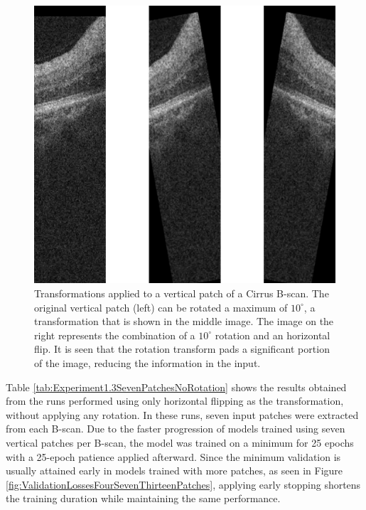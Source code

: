 \begin{figure}[!ht]
	\centering
	\includegraphics[width=0.5\linewidth]{figures/TransformationsInVerticalPatches.png}
	\caption{Transformations applied to a vertical patch of a Cirrus B-scan. The original vertical patch (left) can be rotated a maximum of $10^{\circ}$, a transformation that is shown in the middle image. The image on the right represents the combination of a $10^{\circ}$ rotation and an horizontal flip. It is seen that the rotation transform pads a significant portion of the image, reducing the information in the input.}
	\label{fig:TransformationsInVerticalPatches}
\end{figure}

Table \ref{tab:Experiment1.3SevenPatchesNoRotation} shows the results obtained from the runs performed using only horizontal flipping as the transformation, without applying any rotation. In these runs, seven input patches were extracted from each B-scan. Due to the faster progression of models trained using seven vertical patches per B-scan, the model was trained on a minimum for 25 epochs with a 25-epoch patience applied afterward. Since the minimum validation is usually attained early in models trained with more patches, as seen in Figure \ref{fig:ValidationLossesFourSevenThirteenPatches}, applying early stopping shortens the training duration while maintaining the same performance.

